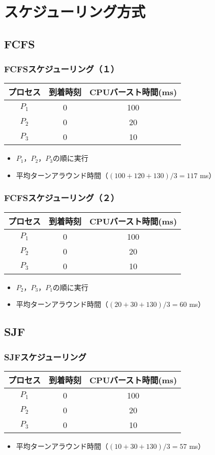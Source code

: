 \documentclass[dvipdfmx]{beamer}
\begin{document}
\section{スケジューリング方式}
\subsection{FCFS}
\begin{frame}
  \frametitle{FCFSスケジューリング（１）}
  \small\begin{tabular}{c c c}
    プロセス & 到着時刻 & CPUバースト時間(ms) \\
    \hline
    $P_1$    & 0 & 100 \\
    $P_2$    & 0 & 20 \\
    $P_3$    & 0 & 10 \\
  \end{tabular}
  \begin{itemize}
    \item $P_1$，$P_2$，$P_3$の順に実行
    \item 平均ターンアラウンド時間（$(100+120+130) / 3 = 117$ ms）
  \end{itemize}
\end{frame}

\begin{frame}
  \frametitle{FCFSスケジューリング（２）}
  \small\begin{tabular}{c c c}
    プロセス & 到着時刻 & CPUバースト時間(ms) \\
    \hline
    $P_1$    & 0 & 100 \\
    $P_2$    & 0 & 20 \\
    $P_3$    & 0 & 10 \\
  \end{tabular}
  \begin{itemize}
    \item $P_2$，$P_3$，$P_1$の順に実行
    \item 平均ターンアラウンド時間（$(20+30+130) / 3 = 60$ ms）
  \end{itemize}
\end{frame}

\subsection{SJF}
\begin{frame}
  \frametitle{SJFスケジューリング}
  \small\begin{tabular}{c c c}
    プロセス & 到着時刻 & CPUバースト時間(ms) \\
    \hline
    $P_1$    & 0 & 100 \\
    $P_2$    & 0 & 20 \\
    $P_3$    & 0 & 10 \\
  \end{tabular}
  \begin{itemize}
    \item 平均ターンアラウンド時間（$(10+30+130) / 3 = 57$ ms）
  \end{itemize}
\end{frame}
\end{document}
